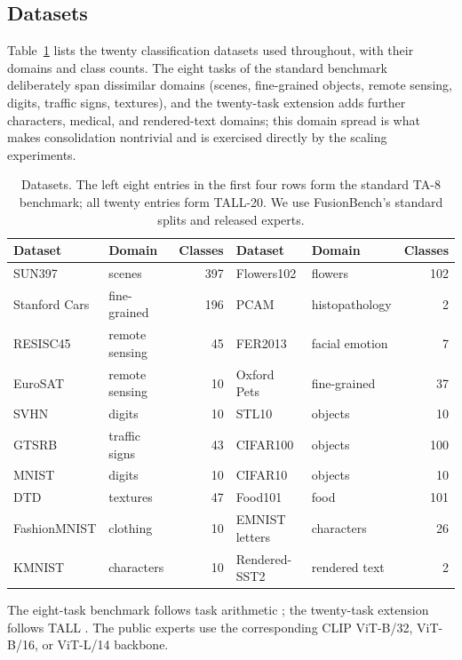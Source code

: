 \documentclass[letterpaper]{article} %
\theoremstyle{plain}
\theoremstyle{definition}
\begin{document}
\subsection{Datasets}
Table~\ref{tab:datasets} lists the twenty classification datasets used throughout, with their domains and class counts.
The eight tasks of the standard benchmark deliberately span dissimilar domains (scenes, fine-grained objects, remote sensing, digits, traffic signs, textures), and the twenty-task extension adds further characters, medical, and rendered-text domains; this domain spread is what makes consolidation nontrivial and is exercised directly by the scaling experiments.

\begin{table}[tb]
\centering
{\small
\begin{tabular*}{\textwidth}{@{\extracolsep{\fill}}llrllr}
\toprule
Dataset & Domain & Classes & Dataset & Domain & Classes \\
\midrule
SUN397 & scenes & 397 & Flowers102 & flowers & 102 \\
Stanford Cars & fine-grained & 196 & PCAM & histopathology & 2 \\
RESISC45 & remote sensing & 45 & FER2013 & facial emotion & 7 \\
EuroSAT & remote sensing & 10 & Oxford Pets & fine-grained & 37 \\
SVHN & digits & 10 & STL10 & objects & 10 \\
GTSRB & traffic signs & 43 & CIFAR100 & objects & 100 \\
MNIST & digits & 10 & CIFAR10 & objects & 10 \\
DTD & textures & 47 & Food101 & food & 101 \\
FashionMNIST & clothing & 10 & EMNIST letters & characters & 26 \\
KMNIST & characters & 10 & Rendered-SST2 & rendered text & 2 \\
\bottomrule
\end{tabular*}
}
\caption{Datasets. The left eight entries in the first four rows form the standard
TA-8 benchmark; all twenty entries form TALL-20.
We use FusionBench's standard splits and released experts.}
\label{tab:datasets}
\end{table}

The eight-task benchmark follows task arithmetic \citep{ilharco2023taskarithmetic}; the twenty-task extension follows TALL \citep{wang2024tall}.
The public experts use the corresponding CLIP ViT-B/32, ViT-B/16, or ViT-L/14 backbone.
\end{document}
